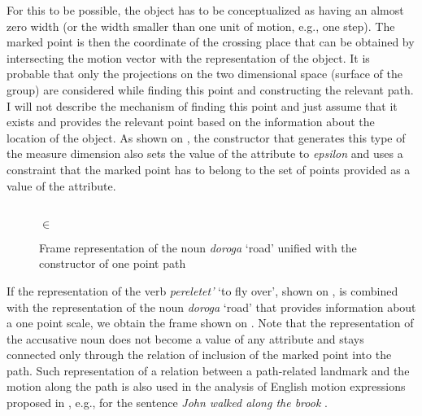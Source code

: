 For this to be possible, the object has to be conceptualized as having an almost zero width (or the width smaller than one unit of motion, e.g., one step). The marked point is then the coordinate of the crossing place that can be obtained by intersecting the motion vector with the representation of the object. It is probable that only the projections on the two dimensional space (surface of the group) are considered while finding this point and constructing the relevant path. I will not describe the mechanism of finding this point and just assume that it exists and provides the relevant point based on the information about the location of the object. As shown on , the constructor that generates this type of the measure dimension also sets the value of the \WIDTH attribute to \textit{epsilon} and uses a constraint that the marked point has to belong to the set of points provided as a value of the \LOC attribute.

\begin{figure}
\begin{minipage}{0.31\textwidth}
\end{minipage}\hfill%
\begin{minipage}{0.6\textwidth}\centering
{}\\
 $\in$ 
\end{minipage}
\caption{Frame representation of the noun \textit{doroga} `road' unified with the constructor of one point path \label{frame:road:point}}
\end{figure}

If the representation of the verb \textit{pereletet'} `to fly over', shown on , is combined with the representation of the noun \textit{doroga} `road' that provides information about a one point scale, we obtain the frame shown on . Note that the representation of the accusative noun does not become a value of any attribute and stays connected only through the relation of inclusion of the marked point into the path. Such representation of a relation between a path-related landmark and the motion along the path is also used in the analysis of English motion expressions proposed in \citealt{KallmeyerOsswald:13}, e.g., for the sentence \textit{John walked along the brook} \citep[Fig.~23, p. 32]{KallmeyerOsswald:13}.


